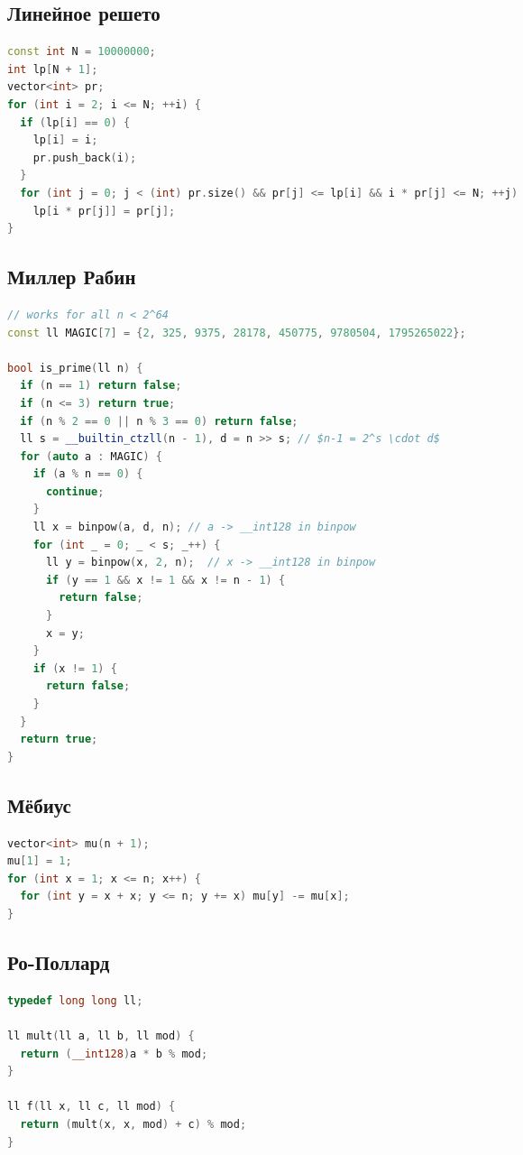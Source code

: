 \documentclass[9pt,a4paper,landscape,twosided]{extarticle}
\begin{document}
\begin{multicols*}{3}
\subsection{Линейное решето}
\begin{lstlisting}[language=C++]
const int N = 10000000;
int lp[N + 1];
vector<int> pr;
for (int i = 2; i <= N; ++i) {
  if (lp[i] == 0) {
    lp[i] = i;
    pr.push_back(i);
  }
  for (int j = 0; j < (int) pr.size() && pr[j] <= lp[i] && i * pr[j] <= N; ++j)
    lp[i * pr[j]] = pr[j];
}
\end{lstlisting}

\subsection{Миллер Рабин}
\begin{lstlisting}[language=C++]
// works for all n < 2^64
const ll MAGIC[7] = {2, 325, 9375, 28178, 450775, 9780504, 1795265022};

bool is_prime(ll n) {
  if (n == 1) return false;
  if (n <= 3) return true;
  if (n % 2 == 0 || n % 3 == 0) return false;
  ll s = __builtin_ctzll(n - 1), d = n >> s; // $n-1 = 2^s \cdot d$
  for (auto a : MAGIC) {
    if (a % n == 0) {
      continue;
    }
    ll x = binpow(a, d, n); // a -> __int128 in binpow
    for (int _ = 0; _ < s; _++) {
      ll y = binpow(x, 2, n);  // x -> __int128 in binpow
      if (y == 1 && x != 1 && x != n - 1) {
        return false;
      }
      x = y;
    }
    if (x != 1) {
      return false;
    }
  }
  return true;
}
\end{lstlisting}

\subsection{Мёбиус}
\begin{lstlisting}[language=C++]
vector<int> mu(n + 1);
mu[1] = 1;
for (int x = 1; x <= n; x++) {
  for (int y = x + x; y <= n; y += x) mu[y] -= mu[x];
}
\end{lstlisting}

\subsection{Ро-Поллард}
\begin{lstlisting}[language=C++]
typedef long long ll;

ll mult(ll a, ll b, ll mod) {
  return (__int128)a * b % mod;
}

ll f(ll x, ll c, ll mod) {
  return (mult(x, x, mod) + c) % mod;
}


\end{lstlisting}
\end{multicols*}
\end{document}
